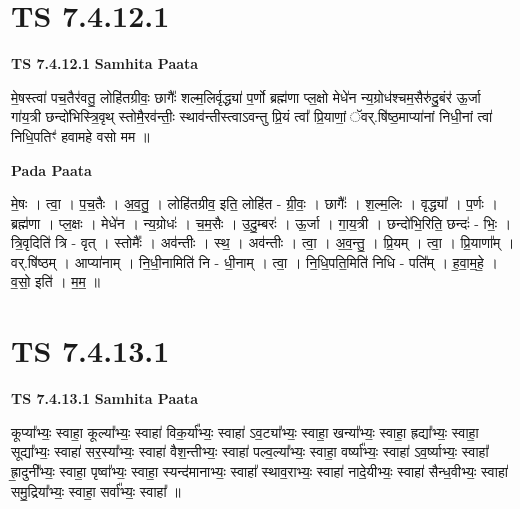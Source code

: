 \documentclass[17pt]{extarticle}
\begin{document}
\section*{ TS 7.4.12.1 }

\textbf{TS 7.4.12.1 } \newline
\textbf{Samhita Paata} \newline

मे॒षस्त्वा॑ पच॒तैर॑वतु॒ लोहि॑तग्रीवः॒ छागैः᳚ शल्म॒लिर्वृद्ध्या॑ प॒र्णो ब्रह्म॑णा प्ल॒क्षो मेधे॑न न्य॒ग्रोध॑श्चम॒सैरु॑दु॒बंर॑ ऊ॒र्जा गा॑य॒त्री छन्दो॑भिस्त्रि॒वृथ् स्तोमै॒रव॑न्तीः॒ स्थाव॑न्तीस्त्वाऽवन्तु प्रि॒यं त्वा᳚ प्रि॒याणां॒ ॅवर्.षि॑ष्ठ॒माप्या॑नां निधी॒नां त्वा॑ निधि॒पतिꣳ॑ हवामहे वसो मम ॥ \newline

\textbf{Pada Paata} \newline

मे॒षः । त्वा॒ । प॒च॒तैः । अ॒व॒तु॒ । लोहि॑तग्रीव॒ इति॒ लोहि॑त - ग्री॒वः॒ । छागैः᳚ । श॒ल्म॒लिः । वृद्ध्या᳚ । प॒र्णः । ब्रह्म॑णा । प्ल॒क्षः । मेधे॑न । न्य॒ग्रोधः॑ । च॒म॒सैः । उ॒दु॒म्बरः॑ । ऊ॒र्जा । गा॒य॒त्री । छन्दो॑भि॒रिति॒ छन्दः॑ - भिः॒ । त्रि॒वृदिति॑ त्रि - वृत् । स्तोमैः᳚ । अव॑न्तीः । स्थ॒ । अव॑न्तीः । त्वा॒ । अ॒व॒न्तु॒ । प्रि॒यम् । त्वा॒ । प्रि॒याणा᳚म् । वर्.षि॑ष्ठम् । आप्या॑नाम् । नि॒धी॒नामिति॑ नि - धी॒नाम् । त्वा॒ । नि॒धि॒पति॒मिति॑ निधि - पति᳚म् । ह॒वा॒म॒हे॒ । व॒सो॒ इति॑ । म॒म॒ ॥  \newline




\section*{ TS 7.4.13.1 }

\textbf{TS 7.4.13.1 } \newline
\textbf{Samhita Paata} \newline

कूप्या᳚भ्यः॒ स्वाहा॒ कूल्या᳚भ्यः॒ स्वाहा॑ विक॒र्या᳚भ्यः॒ स्वाहा॑ ऽव॒ट्या᳚भ्यः॒ स्वाहा॒ खन्या᳚भ्यः॒ स्वाहा॒ ह्रद्या᳚भ्यः॒ स्वाहा॒ सूद्या᳚भ्यः॒ स्वाहा॑ सर॒स्या᳚भ्यः॒ स्वाहा॑ वैश॒न्तीभ्यः॒ स्वाहा॑ पल्व॒ल्या᳚भ्यः॒ स्वाहा॒ वर्ष्या᳚भ्यः॒ स्वाहा॑ ऽव॒र्ष्याभ्यः॒ स्वाहा᳚ ह्रा॒दुनी᳚भ्यः॒ स्वाहा॒ पृष्वा᳚भ्यः॒ स्वाहा॒ स्यन्द॑मानाभ्यः॒ स्वाहा᳚ स्थाव॒राभ्यः॒ स्वाहा॑ नादे॒यीभ्यः॒ स्वाहा॑ सैन्ध॒वीभ्यः॒ स्वाहा॑ समु॒द्रिया᳚भ्यः॒ स्वाहा॒ सर्वा᳚भ्यः॒ स्वाहा᳚ ॥ \newline
\end{document}
